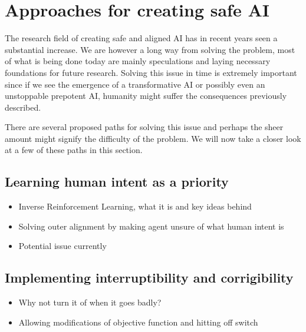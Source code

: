 \documentclass[12pt,A4]{report}
\theoremstyle{definition}
\begin{document}
\section{Approaches for creating safe AI}
The research field of creating safe and aligned AI has in recent years seen a substantial increase. We are however a long way from solving the problem, most of what is being done today are mainly speculations and laying necessary foundations for future research. Solving this issue in time is extremely important since if we see the emergence of a transformative AI or possibly even an unstoppable prepotent AI, humanity might suffer the consequences previously described. 

There are several proposed paths for solving this issue and perhaps the sheer amount might signify the difficulty of the problem. We will now take a closer look at a few of these paths in this section.

\subsection{Learning human intent as a priority}
\begin{itemize}
    \item Inverse Reinforcement Learning, what it is and key ideas behind
    \item Solving outer alignment by making agent unsure of what human intent is
    \item Potential issue currently

\end{itemize}

\subsection{Implementing interruptibility and corrigibility}
\begin{itemize}
    \item Why not turn it of when it goes badly?
    \item Allowing modifications of objective function and hitting off switch
\end{itemize}
\end{document}
